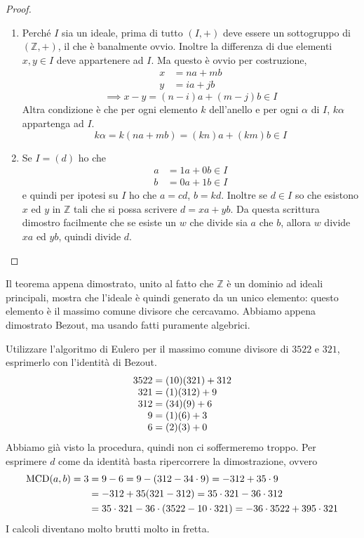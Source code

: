 \begin{proof}\
	\begin{enumerate}
		\item Perché $I$ sia un ideale, prima di tutto $(I,+)$ deve essere un sottogruppo di $(\mathbb{Z},+)$, il che è banalmente ovvio. Inoltre la differenza di due elementi $x,y \in I$ deve appartenere ad $I$. Ma questo è ovvio per costruzione,
		\begin{align*}
		x &= na+mb \\y&=ia+jb
		\end{align*}
		\begin{equation*}
		\implies x-y = (n-i)a+(m-j)b \in I
		\end{equation*}
		Altra condizione è che per ogni elemento $k$ dell'anello e per ogni $\alpha$ di $I$, $k\alpha$ appartenga ad $I$.
		\begin{equation*}
		k\alpha = k(na+mb)=(kn)a+(km)b\in I
		\end{equation*}
		\item Se $I=(d)$ ho che
		\begin{align*}
		a&=1a+0b \in I\\ b&=0a+1b \in I
		\end{align*}
		e quindi per ipotesi su $I$ ho che $a=cd$, $b=kd$. Inoltre se $d \in I$ so che esistono $x$ ed $y$ in $\mathbb{Z}$ tali che si possa scrivere $d=xa+yb$.
		Da questa scrittura dimostro facilmente che se esiste un $w$ che divide sia $a$ che $b$, allora $w$ divide $xa$ ed $yb$, quindi divide $d$. 
	\end{enumerate}
\end{proof}
\begin{osservazione}
	Il teorema appena dimostrato, unito al fatto che $\mathbb{Z}$ è un dominio ad ideali principali, mostra che l'ideale è quindi generato da un unico elemento: questo elemento è il massimo comune divisore che cercavamo. Abbiamo appena dimostrato Bezout, ma usando fatti puramente algebrici.
\end{osservazione}
\begin{esempio}
	Utilizzare l'algoritmo di Eulero per il massimo comune divisore di $3522$ e $321$, esprimerlo con l'identità di Bezout.
	\begin{equation*}
		\arraycolsep=1.4pt
		\begin{array}{rl}
			3522 &= (10)(321)+312\\
			321 &= (1)(312)+9\\
			312 &= (34)(9)+6\\
			9 &=(1)(6)+3\\
			6 &=(2)(3)+0
		\end{array}
	\end{equation*}
	Abbiamo già visto la procedura, quindi non ci soffermeremo troppo. Per esprimere $d$ come da identità basta ripercorrere la dimostrazione, ovvero 
	\begin{align*}
	\operatorname{\mathrm{MCD}}(a,b)=3&= 9-6=9-(312-34\cdot9)=-312+35\cdot9\\
	&= -312+35(321-312)=35\cdot321-36\cdot312\\
	&= 35\cdot321-36\cdot(3522-10\cdot321)=-36\cdot3522+395\cdot321
	\end{align*}
	I calcoli diventano molto brutti molto in fretta.
\end{esempio}
